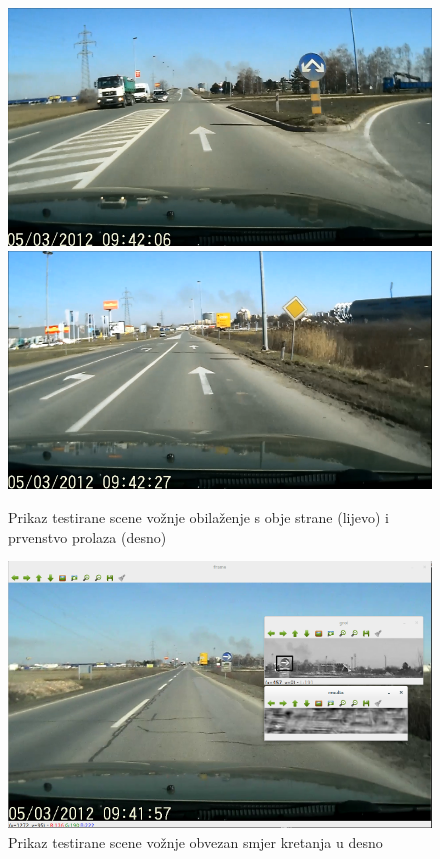 \begin{figure}[!htb]
    \includegraphics[width=\linewidth]{figures/scena1.png}
\endminipage\hfill
{}
\endminipage\hfill
{}
    \includegraphics[width=\linewidth]{figures/scena3.png}
\endminipage\hfill
\caption{Prikaz testirane scene vožnje obilaženje s obje strane (lijevo) i
prvenstvo prolaza (desno)}
\label{fig:scena.png}
\end{figure}

\begin{figure}[h]
\centering
\includegraphics[scale=0.5]{figures/scena2.png}
\caption{Prikaz testirane scene vožnje obvezan smjer kretanja u desno}
\label{fig:scena2}
\end{figure}


